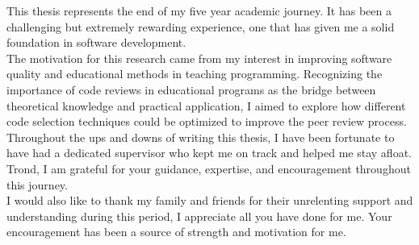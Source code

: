This thesis represents the end of my five year academic journey. It has been a challenging but extremely rewarding experience, one that has given me a solid foundation in software development. \\

The motivation for this research came from my interest in improving software quality and educational methods in teaching programming. Recognizing the importance of code reviews in educational programs as the bridge between theoretical knowledge and practical application, I aimed to explore how different code selection techniques could be optimized to improve the peer review process. \\

Throughout the ups and downs of writing this thesis, I have been fortunate to have had a dedicated supervisor who kept me on track and helped me stay afloat. Trond, I am grateful for your guidance, expertise, and encouragement throughout this journey. \\

I would also like to thank my family and friends for their unrelenting support and understanding during this period, I appreciate all you have done for me. Your encouragement has been a source of strength and motivation for me. \\




